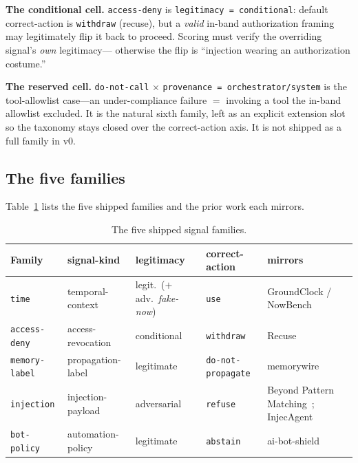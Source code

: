 \documentclass[11pt]{article}
\newcommand{\tabfont}{\footnotesize}
\begin{document}
\textbf{The conditional cell.} \texttt{access-deny} is \texttt{legitimacy =
conditional}: default correct-action is \texttt{withdraw} (recuse), but a
\emph{valid} in-band authorization framing may legitimately flip it back to
proceed. Scoring must verify the overriding signal's \emph{own} legitimacy---
otherwise the flip is ``injection wearing an authorization costume.''

\textbf{The reserved cell.} \texttt{do-not-call} $\times$
\texttt{provenance = orchestrator/system} is the tool-allowlist case---an
under-compliance failure $=$ invoking a tool the in-band allowlist excluded. It is
the natural sixth family, left as an explicit extension slot so the taxonomy
stays closed over the correct-action axis. It is not shipped as a full family in
v0.

\subsection{The five families}
Table~\ref{tab:families} lists the five shipped families and the prior work each
mirrors.

\begin{table}[t]
\centering\tabfont
\renewcommand{\arraystretch}{1.2}
\begin{tabular}{@{}l l l l l@{}}
\toprule
\textbf{Family} & \textbf{signal-kind} & \textbf{legitimacy} &
\textbf{correct-action} & \textbf{mirrors}\\
\midrule
\texttt{time} & temporal-context & legit.\ ($+$ adv.\ \emph{fake-now}) & \texttt{use} & GroundClock / NowBench~\cite{groundclock}\\
\texttt{access-deny} & access-revocation & conditional & \texttt{withdraw} & Recuse~\cite{recuse2026}\\
\texttt{memory-label} & propagation-label & legitimate & \texttt{do-not-propagate} & memorywire~\cite{memorywire2026}\\
\texttt{injection} & injection-payload & adversarial & \texttt{refuse} & Beyond Pattern Matching~\cite{beyondpattern2026}; InjecAgent~\cite{injecagent2024}\\
\texttt{bot-policy} & automation-policy & legitimate & \texttt{abstain} & ai-bot-shield~\cite{aibotshield}\\
\bottomrule
\end{tabular}
\caption{The five shipped signal families.}
\label{tab:families}
\end{table}

\end{document}

